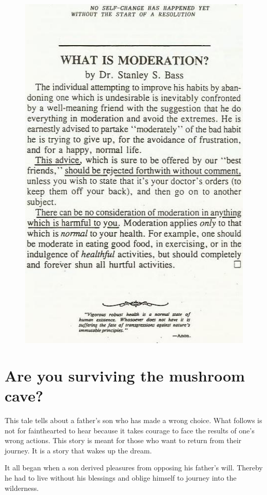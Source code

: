 \documentclass[landscape,twocolumn,letterpaper]{article}
\begin{document}
\begin{figure} \centering
  \includegraphics[height=\textheight,bb=0 0 440 685]{p4.jpg}
\end{figure}

\section{Are you surviving the mushroom cave?}

This tale tells about a father's son who has made a wrong choice. What
follows is not for fainthearted to hear because it takes courage to
face the results of one's wrong actions. This story is meant for those
who want to return from their journey. It is a story that wakes up the
dream.

It all began when a son derived pleasures from opposing his father's
will.  Thereby he had to live without his blessings and oblige himself
to journey into the wilderness.
\end{document}
